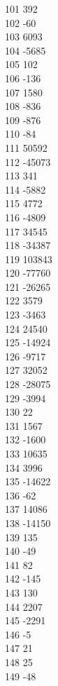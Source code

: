{ 101	392 \\
 102	-60 \\
 103	6093 \\
 104	-5685 \\
 105	102 \\
 106	-136 \\
 107	1580 \\
 108	-836 \\
 109	-876 \\
 110	-84 \\
 111	50592 \\
 112	-45073 \\
 113	341 \\
 114	-5882 \\
 115	4772 \\
 116	-4809 \\
 117	34545 \\
 118	-34387 \\
 119	103843 \\
 120	-77760 \\
 121	-26265 \\
 122	3579 \\
 123	-3463 \\
 124	24540 \\
 125	-14924 \\
 126	-9717 \\
 127	32052 \\
 128	-28075 \\
 129	-3994 \\
 130	22 \\
 131	1567 \\
 132	-1600 \\
 133	10635 \\
 134	3996 \\
 135	-14622 \\
 136	-62 \\
 137	14086 \\
 138	-14150 \\
 139	135 \\
 140	-49 \\
 141	82 \\
 142	-145 \\
 143	130 \\
 144	2207 \\
 145	-2291 \\
 146	-5 \\
 147	21 \\
 148	25 \\
 149	-48 \\
}
